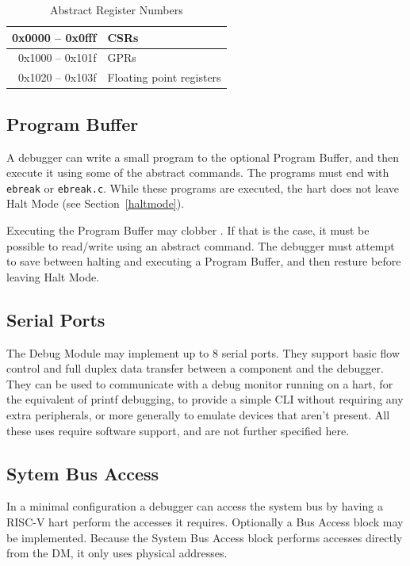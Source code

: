 \documentclass{article}
\begin{document}
\begin{table}[htp]
    \centering
    \caption{Abstract Register Numbers}
    \label{tab:regno}
    \begin{tabulary}{\textwidth}{|r|l|}
        \hline
        0x0000 -- 0x0fff & CSRs \\
        \hline
        0x1000 -- 0x101f & GPRs \\
        \hline
        0x1020 -- 0x103f & Floating point registers \\
        \hline
    \end{tabulary}
\end{table}



\subsection{Program Buffer}

A debugger can write a small program to the optional Program Buffer, and then
execute it using some of the abstract commands. The programs must end with {\tt
ebreak} or {\tt ebreak.c}. While these programs are executed, the hart does not
leave Halt Mode (see Section~\ref{haltmode}).

Executing the Program Buffer may clobber \Rdpc. If that is the case, it must be
possible to read/write \Rdpc using an abstract command. The debugger must
attempt to save \Rdpc between halting and executing a Program Buffer, and then
resture \Rdpc before leaving Halt Mode.

\subsection{Serial Ports}

The Debug Module may implement up to 8 serial ports. They support basic flow
control and full duplex data transfer between a component and the debugger.
They can be used to communicate with a debug monitor running on a hart, for the
equivalent of printf debugging, to provide a simple CLI without requiring any
extra peripherals, or more generally to emulate devices that aren't present.
All these uses require software support, and are not further specified here.

\subsection{Sytem Bus Access}

In a minimal configuration a debugger can access the system bus by having a
RISC-V hart perform the accesses it requires. Optionally a Bus Access block may
be implemented. Because the System Bus Access block performs accesses directly
from the DM, it only uses physical addresses.
\end{document}

